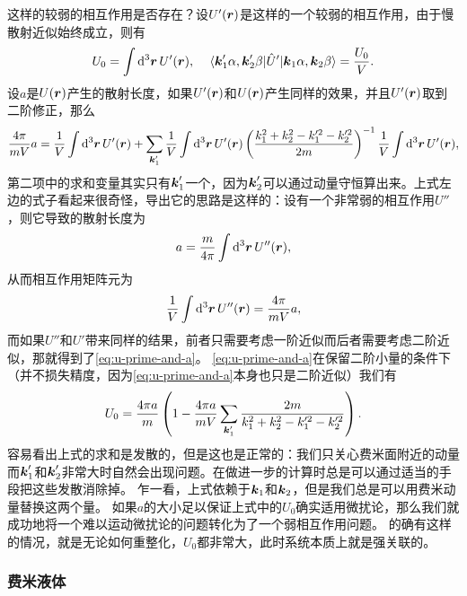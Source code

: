 \documentclass[hyperref, UTF8, a4paper]{ctexart}
\begin{document}
这样的较弱的相互作用是否存在？设$U'(\vb*{r})$是这样的一个较弱的相互作用，由于慢散射近似始终成立，则有
\[
    U_0 = \int \dd[3]{\vb*{r}} U'(\vb*{r}), \quad \mel*{\vb*{k}_1' \alpha, \vb*{k}_2' \beta}{\hat{U}'}{\vb*{k}_1 \alpha, \vb*{k}_2 \beta} = \frac{U_0}{V}.
\]
设$a$是$U(\vb*{r})$产生的散射长度，如果$U'(\vb*{r})$和$U(\vb*{r})$产生同样的效果，并且$U'(\vb*{r})$取到二阶修正，那么
\begin{equation}
    \frac{4\pi}{m V} a  = \frac{1}{V} \int \dd[3]{\vb*{r}} U'(\vb*{r}) + \sum_{\vb*{k}'_1} \frac{1}{V} \int \dd[3]{\vb*{r}} U'(\vb*{r}) \left( \frac{k_1^2 + k_2^2 - k_1'^2 - k_2'^2}{2m} \right)^{-1} \frac{1}{V} \int \dd[3]{\vb*{r}} U'(\vb*{r}),
    \label{eq:u-prime-and-a}
\end{equation}
第二项中的求和变量其实只有$\vb*{k}_1'$一个，因为$\vb*{k}_2'$可以通过动量守恒算出来。上式左边的式子看起来很奇怪，导出它的思路是这样的：设有一个非常弱的相互作用$U''$，则它导致的散射长度为
\[
    a = \frac{m}{4\pi} \int \dd[3]{\vb*{r}} U''(\vb*{r}),
\]
从而相互作用矩阵元为
\[
    \frac{1}{V} \int \dd[3]{\vb*{r}} U''(\vb*{r}) = \frac{4\pi}{m V} a,
\]
而如果$U''$和$U'$带来同样的结果，前者只需要考虑一阶近似而后者需要考虑二阶近似，那就得到了\eqref{eq:u-prime-and-a}。
\eqref{eq:u-prime-and-a}在保留二阶小量的条件下（并不损失精度，因为\eqref{eq:u-prime-and-a}本身也只是二阶近似）我们有
\begin{equation}
    U_0 = \frac{4\pi a}{m} \left( 1 - \frac{4\pi a}{m V} \sum_{\vb*{k}'_1} \frac{2m}{k_1^2 + k_2^2 - k_1'^2 - k_2'^2} \right).
    \label{eq:u0-and-a-second-order}
\end{equation}
容易看出上式的求和是发散的，但是这也是正常的：我们只关心费米面附近的动量而$\vb*{k}_1'$和$\vb*{k}_2'$非常大时自然会出现问题。在做进一步的计算时总是可以通过适当的手段把这些发散消除掉。
乍一看，上式依赖于$\vb*{k}_1$和$\vb*{k}_2$，但是我们总是可以用费米动量替换这两个量。 %
如果$a$的大小足以保证上式中的$U_0$确实适用微扰论，那么我们就成功地将一个难以运动微扰论的问题转化为了一个弱相互作用问题。
的确有这样的情况，就是无论如何重整化，$U_0$都非常大，此时系统本质上就是强关联的。

\subsubsection{费米液体}
\end{document}
